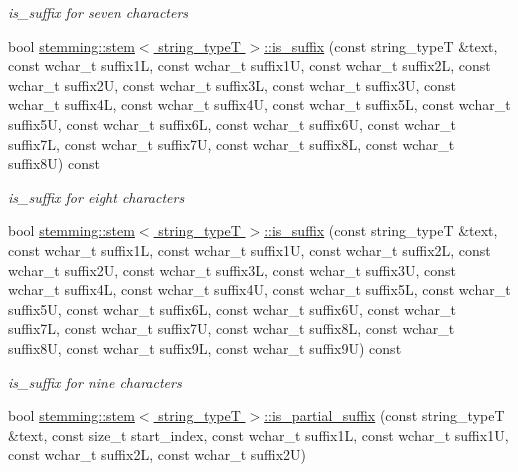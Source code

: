 \begin{DoxyCompactItemize}
\begin{DoxyCompactList}\small\item\em is\-\_\-suffix for seven characters \end{DoxyCompactList}\item 
\hypertarget{group___stemming_gaa18daf5b33d220d93dff22d6e591edd6}{bool \hyperlink{group___stemming_gaa18daf5b33d220d93dff22d6e591edd6}{stemming\-::stem$<$ string\-\_\-type\-T $>$\-::is\-\_\-suffix} (const string\-\_\-type\-T \&text, const wchar\-\_\-t suffix1\-L, const wchar\-\_\-t suffix1\-U, const wchar\-\_\-t suffix2\-L, const wchar\-\_\-t suffix2\-U, const wchar\-\_\-t suffix3\-L, const wchar\-\_\-t suffix3\-U, const wchar\-\_\-t suffix4\-L, const wchar\-\_\-t suffix4\-U, const wchar\-\_\-t suffix5\-L, const wchar\-\_\-t suffix5\-U, const wchar\-\_\-t suffix6\-L, const wchar\-\_\-t suffix6\-U, const wchar\-\_\-t suffix7\-L, const wchar\-\_\-t suffix7\-U, const wchar\-\_\-t suffix8\-L, const wchar\-\_\-t suffix8\-U) const }\label{group___stemming_gaa18daf5b33d220d93dff22d6e591edd6}

\begin{DoxyCompactList}\small\item\em is\-\_\-suffix for eight characters \end{DoxyCompactList}\item 
\hypertarget{group___stemming_gab905150e381f068c6b04eba851bb6263}{bool \hyperlink{group___stemming_gab905150e381f068c6b04eba851bb6263}{stemming\-::stem$<$ string\-\_\-type\-T $>$\-::is\-\_\-suffix} (const string\-\_\-type\-T \&text, const wchar\-\_\-t suffix1\-L, const wchar\-\_\-t suffix1\-U, const wchar\-\_\-t suffix2\-L, const wchar\-\_\-t suffix2\-U, const wchar\-\_\-t suffix3\-L, const wchar\-\_\-t suffix3\-U, const wchar\-\_\-t suffix4\-L, const wchar\-\_\-t suffix4\-U, const wchar\-\_\-t suffix5\-L, const wchar\-\_\-t suffix5\-U, const wchar\-\_\-t suffix6\-L, const wchar\-\_\-t suffix6\-U, const wchar\-\_\-t suffix7\-L, const wchar\-\_\-t suffix7\-U, const wchar\-\_\-t suffix8\-L, const wchar\-\_\-t suffix8\-U, const wchar\-\_\-t suffix9\-L, const wchar\-\_\-t suffix9\-U) const }\label{group___stemming_gab905150e381f068c6b04eba851bb6263}

\begin{DoxyCompactList}\small\item\em is\-\_\-suffix for nine characters \end{DoxyCompactList}\item 
\hypertarget{group___stemming_ga2ae63cf92bc4f4f40f0093e4842a235f}{bool \hyperlink{group___stemming_ga2ae63cf92bc4f4f40f0093e4842a235f}{stemming\-::stem$<$ string\-\_\-type\-T $>$\-::is\-\_\-partial\-\_\-suffix} (const string\-\_\-type\-T \&text, const size\-\_\-t start\-\_\-index, const wchar\-\_\-t suffix1\-L, const wchar\-\_\-t suffix1\-U, const wchar\-\_\-t suffix2\-L, const wchar\-\_\-t suffix2\-U)}\label{group___stemming_ga2ae63cf92bc4f4f40f0093e4842a235f}


\end{DoxyCompactItemize}
